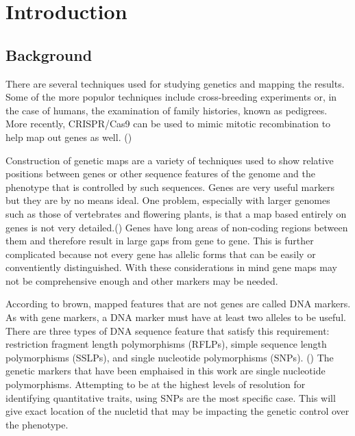 \documentclass[11pt,]{book}
\theoremstyle{definition}
\theoremstyle{definition}
\theoremstyle{remark}
\begin{document}
\chapter{Introduction}\label{intro}

\section{Background}\label{background}

There are several techniques used for studying genetics and mapping the
results. Some of the more populor techniques include cross-breeding
experiments or, in the case of humans, the examination of family
histories, known as pedigrees. More recently, CRISPR/Cas9 can be used to
mimic mitotic recombination to help map out genes as well.
(\cite{sadhu2016crispr})

Construction of genetic maps are a variety of techniques used to show
relative positions between genes or other sequence features of the
genome and the phenotype that is controlled by such sequences. Genes are
very useful markers but they are by no means ideal. One problem,
especially with larger genomes such as those of vertebrates and
flowering plants, is that a map based entirely on genes is not very
detailed.(\cite{brown2006genomes}) Genes have long areas of non-coding
regions between them and therefore result in large gaps from gene to
gene. This is further complicated because not every gene has allelic
forms that can be easily or conventiently distinguished. With these
considerations in mind gene maps may not be comprehensive enough and
other markers may be needed.

According to brown, mapped features that are not genes are called DNA
markers. As with gene markers, a DNA marker must have at least two
alleles to be useful. There are three types of DNA sequence feature that
satisfy this requirement: restriction fragment length polymorphisms
(RFLPs), simple sequence length polymorphisms (SSLPs), and single
nucleotide polymorphisms (SNPs). (\cite{brown2006genomes}) The genetic
markers that have been emphaised in this work are single nucleotide
polymorphisms. Attempting to be at the highest levels of resolution for
identifying quantitative traits, using SNPs are the most specific case.
This will give exact location of the nucletid that may be impacting the
genetic control over the phenotype.
\end{document}
